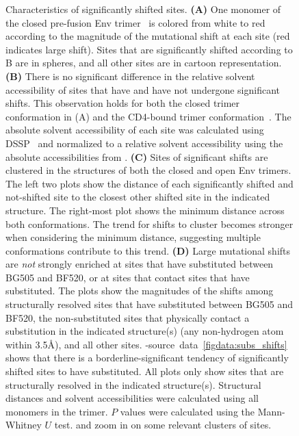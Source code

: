 \documentclass[9pt]{elife}
\newcommand{\angstrom}{\textup{\AA}}
\begin{document}
\begin{figure}
\caption{\label{fig:shiftfeatures}
Characteristics of significantly shifted sites.
{\bf (A)} One monomer of the closed pre-fusion Env trimer~\citep[PDB 5FYL;][]{stewart2016trimeric} is colored from white to red according to the magnitude of the mutational shift at each site (red indicates large shift).
Sites that are significantly shifted according to B are in spheres, and all other sites are in cartoon representation.
{\bf (B)} 
There is no significant difference in the relative solvent accessibility of sites that have and have not undergone significant shifts.
This observation holds for both the closed trimer conformation in (A) and the CD4-bound trimer conformation~\citep[PDB 5VN3;][]{ozorowski2017open}.
The absolute solvent accessibility of each site was calculated using DSSP~\citep{kabsch1983dictionary} and normalized to a relative solvent accessibility using the absolute accessibilities from \citet{tien2013maximum}.
{\bf (C)} 
Sites of significant shifts are clustered in the structures of both the closed and open Env trimers.
The left two plots show the distance of each significantly shifted and not-shifted site to the closest other shifted site in the indicated structure.
The right-most plot shows the minimum distance across both conformations.
The trend for shifts to cluster becomes stronger when considering the minimum distance, suggesting multiple conformations contribute to this trend.
{\bf (D)}
Large mutational shifts are \emph{not} strongly enriched at sites that have substituted between BG505 and BF520, or at sites that contact sites that have substituted. 
The plots show the magnitudes of the shifts among structurally resolved sites that have substituted between BG505 and BF520, the non-substituted sites that physically contact a substitution in the indicated structure(s) (any non-hydrogen atom within 3.5\angstrom), and all other sites.
-source~data~\ref{figdata:subs_shifts} shows that there is a borderline-significant tendency of significantly shifted sites to have substituted.
All plots only show sites that are structurally resolved in the indicated structure(s). 
Structural distances and solvent accessibilities were calculated using all monomers in the trimer.
$P$ values were calculated using the Mann-Whitney $U$ test.
 and  zoom in on some relevant clusters of sites.
}


\end{figure}
\end{document}
